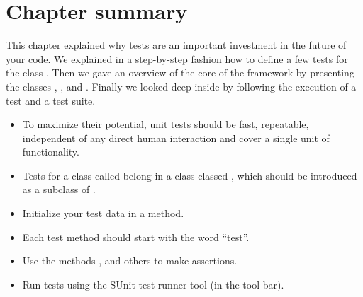 \documentclass[a4paper,10pt,twoside]{book}
\begin{document}



\section{Chapter summary}

This chapter explained why tests are an important investment in 
the future of your code.  
We explained in a step-by-step fashion how
to define a few tests for the class .
Then we gave an overview of the core of the \sunit framework by presenting
the classes , , 
and .  Finally we looked deep inside \sunit by
following the execution of a test and a test suite.

\begin{itemize}
  \item To maximize their potential, unit tests should be fast, repeatable, independent of any direct human interaction and cover a single unit of functionality.
  \item Tests for a class called  belong in a class classed , which should be introduced as a subclass of .
  \item Initialize your test data in a  method.
  \item Each test method should start with the word ``test''.
  \item Use the  methods ,  and others to make assertions.
  \item Run tests using the SUnit test runner tool (in the tool bar).
\end{itemize}

\ifx\wholebook\relax\else
   
   
\end{document}
